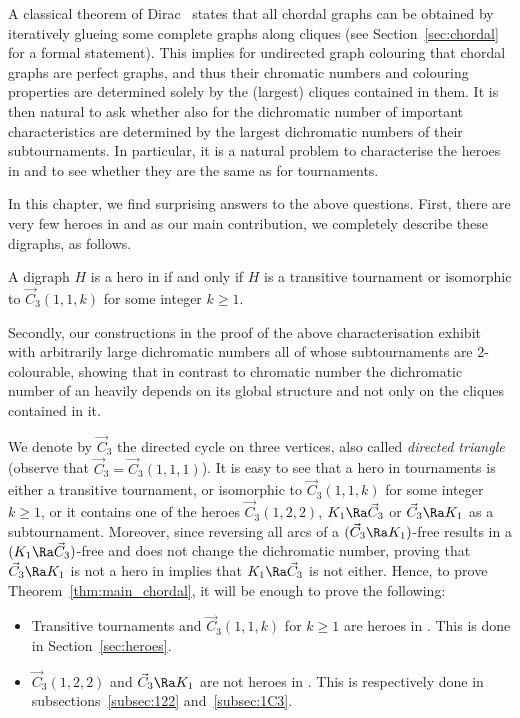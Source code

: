 A classical theorem of Dirac~\cite{D61} states that all chordal graphs can be obtained by iteratively glueing some complete graphs along cliques (see Section~\ref{sec:chordal} for a formal statement). 
 This implies for undirected graph colouring that chordal graphs are perfect graphs, and thus their chromatic numbers and colouring properties are determined solely by the (largest) cliques contained in them.
 It is then natural to ask whether also for the dichromatic number of \ocgs important characteristics are determined by the largest dichromatic numbers of their subtournaments. In particular, it is a natural problem to characterise the heroes in \ocgs and to see whether they are the same as for tournaments.
 
 In this chapter, we find surprising answers to the above questions. First, there are very few heroes in \ocgs and as our main contribution, we completely describe these digraphs, as follows. 

\begin{theorem}\label{thm:main_chordal}
A digraph $H$ is a hero in \ocgs if and only if $H$ is a transitive tournament or isomorphic to $\vec C_{3}(1,1,k)$ for some integer $k \ge 1$.
\end{theorem} 

Secondly, our constructions in the proof of the above characterisation exhibit \ocgs with arbitrarily large dichromatic numbers all of whose subtournaments are $2$-colourable, showing that in contrast to chromatic number the dichromatic number of an \ocg heavily depends on its global structure and not only on the cliques contained in it.

We denote by $\vec C_3$ the directed cycle on three vertices, also called \emph{directed triangle} (observe that $\vec C_3 = \vec C_{3}(1,1,1)$). 
It is easy to see that a hero in tournaments is either a transitive tournament, or isomorphic to  $\vec C_{3}(1,1,k)$ for some integer $k \ge 1$, or it contains one of the heroes $\vec C_{3}(1,2,2)$, $K_1 \Ra \vec C_3$ or $\vec C_3 \Ra K_1$ as a subtournament. Moreover, since  reversing all arcs of a $(\vec C_3 \Ra K_1)$-free \ocg results in a $ (K_1 \Ra \vec C_3)$-free \ocg and does not change the dichromatic number, proving that $\vec C_3 \Ra K_1$ is not a hero in \ocgs implies that $K_1 \Ra \vec C_3$ is not either. 
Hence, to prove Theorem~\ref{thm:main_chordal}, it will be enough to prove the following: 
\begin{itemize}
    \item Transitive tournaments and $\vec C_{3}(1,1,k)$ for $k \ge 1$ are heroes in \ocgs. This is done in Section~\ref{sec:heroes}.
    \item  $\vec C_{3}(1,2,2)$ and $\vec C_3 \Ra K_1$ are not heroes in \ocgs. This is respectively done in subsections~\ref{subsec:122} and~\ref{subsec:1C3}. 
\end{itemize}

